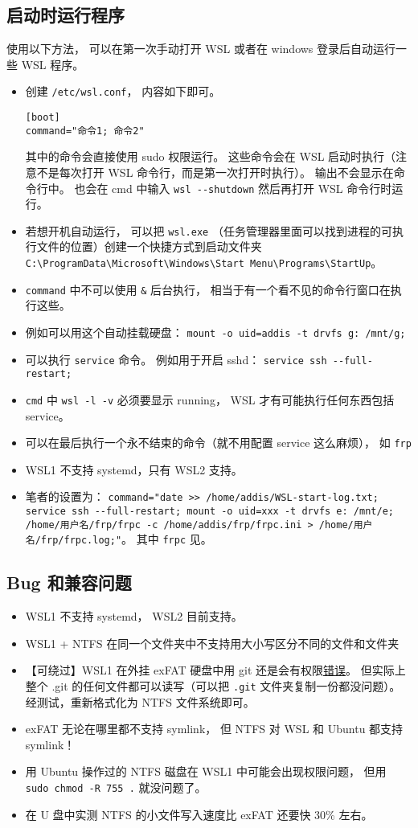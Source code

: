\subsection{启动时运行程序}
使用以下方法， 可以在第一次手动打开 WSL 或者在 windows 登录后自动运行一些 WSL 程序。

\begin{itemize}
\item 创建 \verb|/etc/wsl.conf|， 内容如下即可。
\begin{lstlisting}[language=none]
[boot]
command="命令1; 命令2"
\end{lstlisting}
其中的命令会直接使用 sudo 权限运行。 这些命令会在 WSL 启动时执行（注意不是每次打开 WSL 命令行，而是第一次打开时执行）。 输出不会显示在命令行中。 也会在 cmd 中输入 \verb|wsl --shutdown| 然后再打开 WSL 命令行时运行。
\item 若想开机自动运行， 可以把 \verb|wsl.exe| （任务管理器里面可以找到进程的可执行文件的位置）创建一个快捷方式到启动文件夹 \verb|C:\ProgramData\Microsoft\Windows\Start Menu\Programs\StartUp|。
\item \verb`command` 中不可以使用 \verb|&| 后台执行， 相当于有一个看不见的命令行窗口在执行这些。
\item 例如可以用这个自动挂载硬盘： \verb|mount -o uid=addis -t drvfs g: /mnt/g;|
\item 可以执行 \verb|service| 命令。 例如用于开启 sshd： \verb|service ssh --full-restart;|
\item \verb|cmd| 中 \verb|wsl -l -v| 必须要显示 running， WSL 才有可能执行任何东西包括 service。
\item 可以在最后执行一个永不结束的命令（就不用配置 service 这么麻烦）， 如 \verb|frp|
\item WSL1 不支持 systemd，只有 WSL2 支持。
\item 笔者的设置为： \verb|command="date >> /home/addis/WSL-start-log.txt; service ssh --full-restart; mount -o uid=xxx -t drvfs e: /mnt/e; /home/用户名/frp/frpc -c /home/addis/frp/frpc.ini > /home/用户名/frp/frpc.log;"|。 其中 \verb|frpc| 见。
\end{itemize}

\subsection{Bug 和兼容问题}
\begin{itemize}
\item WSL1 不支持 systemd， WSL2 目前支持。
\item WSL1 + NTFS 在同一个文件夹中不支持用大小写区分不同的文件和文件夹
\item 【可绕过】WSL1 在外挂 exFAT 硬盘中用 git 还是会有权限\href{https://github.com/microsoft/WSL/issues/5179}{错误}。 但实际上整个 .git 的任何文件都可以读写（可以把 \verb|.git| 文件夹复制一份都没问题）。 经测试，重新格式化为 NTFS 文件系统即可。
\item  exFAT 无论在哪里都不支持 symlink， 但 NTFS 对 WSL 和 Ubuntu 都支持 symlink！
\item 用 Ubuntu 操作过的 NTFS 磁盘在 WSL1 中可能会出现权限问题， 但用 \verb|sudo chmod -R 755 .| 就没问题了。
\item 在 U 盘中实测 NTFS 的小文件写入速度比 exFAT 还要快 30\% 左右。
\end{itemize}
